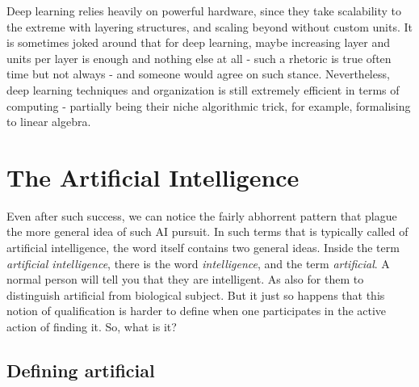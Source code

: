 Deep learning relies heavily on powerful hardware, since they take scalability to the extreme with layering structures, and scaling beyond without custom units. It is sometimes joked around that for deep learning, maybe increasing layer and units per layer is enough and nothing else at all - such a rhetoric is true often time but not always - and someone would agree on such stance. Nevertheless, deep learning techniques and organization is still extremely efficient in terms of computing - partially being their niche algorithmic trick, for example, formalising to linear algebra. 

\section{The Artificial Intelligence}

Even after such success, we can notice the fairly abhorrent pattern that plague the more general idea of such AI pursuit. In such terms that is typically called of artificial intelligence, the word itself contains two general ideas. Inside the term \textit{artificial intelligence}, there is the word \textit{intelligence}, and the term \textit{artificial}. A normal person will tell you that they are intelligent. As also for them to distinguish artificial from biological subject. But it just so happens that this notion of qualification is harder to define when one participates in the active action of finding it. So, what is it? 

\subsection{Defining artificial}

